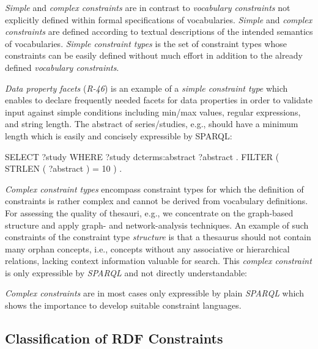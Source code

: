 \documentclass{llncs}
\begin{document}
\emph{Simple} and \emph{complex constraints} are in contrast to \emph{vocabulary constraints} not explicitly defined within formal specifications of vocabularies.
\emph{Simple} and \emph{complex constraints} are defined according to textual descriptions of the intended semantics of vocabularies.  
\emph{Simple constraint types} is the set of constraint types whose constraints can be easily defined without much effort in addition to the already defined \emph{vocabulary constraints}.
{\emph{Data property facets} (\emph{R-46}) is an example of a \emph{simple constraint type} which enables to declare frequently needed facets for data properties in order to validate input against simple conditions including min/max values, regular expressions, and string length.
The abstract of series/studies, e.g., should have a minimum length which is easily and concisely expressible by SPARQL: 
\begin{ex}
SELECT ?study WHERE {
    ?study dcterms:abstract ?abstract . FILTER ( STRLEN ( ?abstract ) = 10 ) . }
\end{ex}

\emph{Complex constraint types} encompass constraint types for which the definition of constraints is rather complex and cannot be derived from vocabulary definitions.
For assessing the quality of thesauri, e.g., we concentrate on the graph-based structure and apply graph- and network-analysis techniques.
An example of such constraints of the constraint type \emph{structure} is that 
a thesaurus should not contain many orphan concepts, i.e., concepts without any associative or hierarchical relations, lacking context information valuable for search. This \emph{complex constraint} is only expressible by \emph{SPARQL} and not directly understandable:
\begin{ex}
SELECT ?concept WHERE {
    ?concept a [rdfs:subClassOf* skos:Concept] .
    FILTER NOT EXISTS { ?concept ?p ?o . 
        FILTER ( ?p IN ( skos:related, skos:relatedMatch, skos:broader, ... ) ) . }
\end{ex}
\emph{Complex constraints} are in most cases only expressible by plain \emph{SPARQL}
which shows the importance to develop suitable constraint languages.

\subsection{Classification of RDF Constraints}

}
\end{document}
